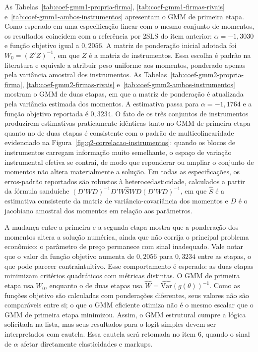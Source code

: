 \documentclass[12pt,a4paper]{article}
\begin{document}
\begin{enumerate}
As Tabelas~\ref{tab:coef-gmm1-propria-firma}, \ref{tab:coef-gmm1-firmas-rivais} e~\ref{tab:coef-gmm1-ambos-instrumentos} apresentam o GMM de primeira etapa. Como esperado em uma especificação linear com o mesmo conjunto de momentos, os resultados coincidem com a referência por 2SLS do item anterior: \(\alpha=-1{,}3030\) e função objetivo igual a \(0{,}2056\). A matriz de ponderação inicial adotada foi \(W_0 = (Z'Z)^{-1}\), em que \(Z\) é a matriz de instrumentos. Essa escolha é padrão na literatura e equivale a atribuir peso uniforme aos momentos, ponderado apenas pela variância amostral dos instrumentos.
As Tabelas~\ref{tab:coef-gmm2-propria-firma}, \ref{tab:coef-gmm2-firmas-rivais} e~\ref{tab:coef-gmm2-ambos-instrumentos} mostram o GMM de duas etapas, em que a matriz de ponderação é atualizada pela variância estimada dos momentos. A estimativa passa para \(\alpha=-1{,}1764\) e a função objetivo reportada é \(0{,}3234\). O fato de os três conjuntos de instrumentos produzirem estimativas praticamente idênticas tanto no GMM de primeira etapa quanto no de duas etapas é consistente com o padrão de multicolinearidade evidenciado na Figura~\ref{fig:q2-correlacao-instrumentos}: quando os blocos de instrumentos carregam informação muito semelhante, o espaço de variação instrumental efetiva se contrai, de modo que reponderar ou ampliar o conjunto de momentos não altera materialmente a solução. Em todas as especificações, os erros-padrão reportados são robustos à heterocedasticidade, calculados a partir da fórmula sanduíche \((D'WD)^{-1}D'W\hat{S}WD(D'WD)^{-1}\), em que \(\hat{S}\) é a estimativa consistente da matriz de variância-covariância dos momentos e \(D\) é o jacobiano amostral dos momentos em relação aos parâmetros.

A mudança entre a primeira e a segunda etapa mostra que a ponderação dos momentos altera a solução numérica, ainda que não corrija o principal problema econômico: o parâmetro de preço permanece com sinal inadequado. Vale notar que o valor da função objetivo aumenta de \(0{,}2056\) para \(0{,}3234\) entre as etapas, o que pode parecer contraintuitivo. Esse comportamento é esperado: as duas etapas minimizam critérios quadráticos com métricas distintas. O GMM de primeira etapa usa \(W_0\), enquanto o de duas etapas usa \(\hat{W} = \widehat{\text{Var}}(g(\theta))^{-1}\). Como as funções objetivo são calculadas com ponderações diferentes, seus valores não são comparáveis entre si; o que o GMM eficiente otimiza não é o mesmo escalar que o GMM de primeira etapa minimizou. Assim, o GMM estrutural cumpre a lógica solicitada na lista, mas seus resultados para o logit simples devem ser interpretados com cautela. Essa cautela será retomada no item 6, quando o sinal de \(\alpha\) afetar diretamente elasticidades e markups.


\end{enumerate}
\end{document}
